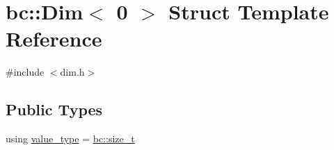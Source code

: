 \hypertarget{structbc_1_1Dim_3_010_01_4}{}\section{bc\+:\+:Dim$<$ 0 $>$ Struct Template Reference}
\label{structbc_1_1Dim_3_010_01_4}


{\ttfamily \#include $<$dim.\+h$>$}

\subsection*{Public Types}
\begin{DoxyCompactItemize}
\item 
using \hyperlink{structbc_1_1Dim_3_010_01_4_a561dbc6acbf3e9fe5c4a06aba2f8b968}{value\+\_\+type} = \hyperlink{namespacebc_aaf8e3fbf99b04b1b57c4f80c6f55d3c5}{bc\+::size\+\_\+t}
\end{DoxyCompactItemize}
